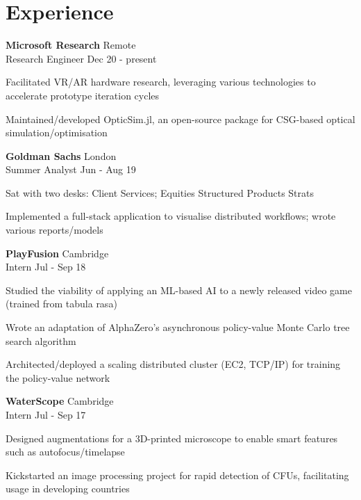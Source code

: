 \documentclass[letterpaper, 10pt]{article}
\begin{document}
\section*{Experience}
\textbf{Microsoft Research} \hfill Remote\\
Research Engineer \hfill Dec 20 - present
\begin{compact}
	\item Facilitated VR/AR hardware research, leveraging various technologies to accelerate prototype iteration cycles
	\item Maintained/developed OpticSim.jl, an open-source package for CSG-based optical simulation/optimisation
\end{compact}
\vspace{.5\baselineskip}
\textbf{Goldman Sachs} \hfill London\\
Summer Analyst \hfill Jun - Aug 19
\begin{compact}
	\item Sat with two desks: Client Services; Equities Structured Products Strats
	\item Implemented a full-stack application to visualise distributed workflows; wrote various reports/models
\end{compact}
\vspace{.5\baselineskip}
\textbf{PlayFusion} \hfill Cambridge\\
Intern \hfill Jul - Sep 18
\begin{compact}
	\item Studied the viability of applying an ML-based AI to a newly released video game (trained from tabula rasa)
	\item Wrote an adaptation of AlphaZero's asynchronous policy-value Monte Carlo tree search algorithm
	\item Architected/deployed a scaling distributed cluster (EC2, TCP/IP) for training the policy-value network
\end{compact}
\vspace{.5\baselineskip}
\textbf{WaterScope} \hfill Cambridge\\
Intern \hfill Jul - Sep 17
\begin{compact}
	\item Designed augmentations for a 3D-printed microscope to enable smart features such as autofocus/timelapse
	\item Kickstarted an image processing project for rapid detection of CFUs, facilitating usage in developing countries
\end{compact}
\end{document}
